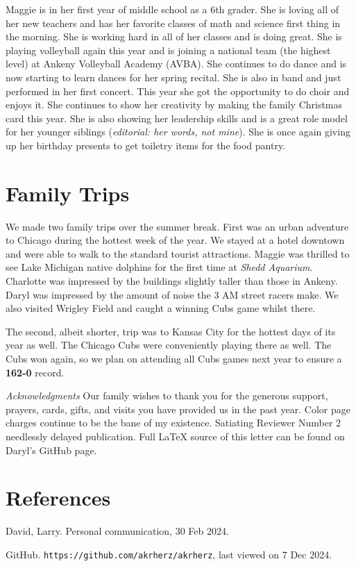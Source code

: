 \documentclass[letterpaper,11pt]{article}
\def\refer{\par\noindent\hangindent\parindent\hangafter1}
\begin{document}
\begin{multicols}{2}
Maggie is in her first year of middle school as a 6th grader. She is loving all
of her new teachers and has her favorite classes of math and science first thing
in the morning.
She is working hard in all of her classes and is doing great. She is playing
volleyball again this year
and is joining a national team (the highest level) at Ankeny Volleyball Academy (AVBA).
She continues 
to do dance and is now starting to learn dances for her spring recital.
She is also in band and just 
performed in her first concert. This year she got the opportunity to do choir
and enjoys it.
She continues to show her creativity by making the family Christmas card this year.
She is also showing her leadership skills and is a great role model for her
younger siblings (\textit{editorial: her words, not mine}).
She is once again giving up her birthday presents to get toiletry items for
the food pantry.


\section{Family Trips}

We made two family trips over the summer break.  First was an urban
adventure to Chicago during the hottest week of the year.
We stayed at a hotel downtown and were able to walk
to the standard tourist attractions.  Maggie was thrilled to see Lake Michigan
native dolphins for the first time at \textit{Shedd Aquarium}. Charlotte was
impressed by the buildings slightly taller than those in Ankeny. Daryl was
impressed by the amount of noise the 3 AM street racers make. 
We also visited Wrigley Field and caught
a winning Cubs game whilst there.

The second, albeit shorter, trip was to Kansas City for the hottest days of
its year as well. The Chicago Cubs were conveniently
playing there as well.  The Cubs won again, so we plan on
attending all Cubs games next year to ensure a \textbf{162-0} record.

\bigskip

\emph{Acknowledgments} Our family wishes to thank you for the generous 
support, prayers, cards, gifts, and visits you have provided us in the past
year. Color page charges continue to be the bane of my existence.
Satiating Reviewer Number 2 needlessly delayed publication. Full
\LaTeX\xspace source of this letter can be found on Daryl's GitHub page. 

\section{References}

\refer David, Larry. Personal communication, 30 Feb 2024.
\refer GitHub. \texttt{https://github.com/akrherz/akrherz}, last viewed on 7 Dec 2024.

\end{multicols}
\end{document}
